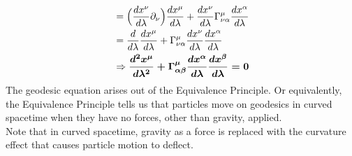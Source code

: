 \documentclass[10pt]{article}
\begin{document}
\begin{enumerate}
\begin{align}
                            &= \Big( \frac{d x^{\nu}}{d \lambda}\partial_{\nu} \Big)\frac{d x^{\mu}}{d \lambda} + \frac{d x^{\nu}}{d \lambda} \Gamma^{\mu}_{\nu \alpha}\frac{d x^{\alpha}}{d \lambda} \notag \\
                            &= \frac{d }{d \lambda}\frac{d x^{\mu}}{d \lambda} + \Gamma^{\mu}_{\nu \alpha} \frac{d x^{\nu}}{d \lambda} \frac{d x^{\alpha}}{d \lambda} \notag \\
                            &\Rightarrow \boldsymbol{\frac{d^{2} x^{\mu}}{d \lambda^{2}} + \Gamma^{\mu}_{\alpha \beta} \frac{d x^{\alpha}}{d \lambda} \frac{d x^{\beta}}{d \lambda} = 0}
                        \end{align}
                    The geodesic equation arises out of the Equivalence Principle. Or equivalently, the Equivalence Principle tells us that particles move on geodesics in curved spacetime when they have no forces, other than gravity, applied. 
                    \\
                    Note that in curved spacetime, gravity as a force is replaced with the curvature effect that causes particle motion to deflect.
                \end{enumerate}
            
\end{document}

